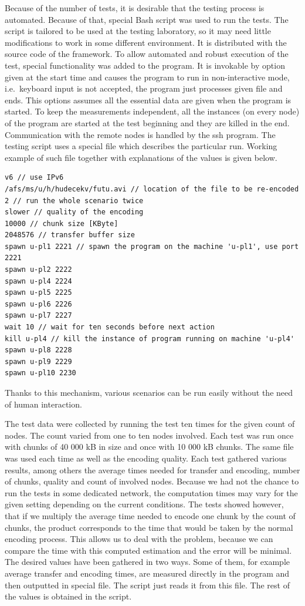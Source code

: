 Because of the number of tests, it is desirable that the testing process
is automated. Because of that, special Bash script was used to run the
tests. The script is tailored to be used at the testing laboratory, so
it may need little modifications to work in some different environment.
It is distributed with the source code of the framework. To allow
automated and robust execution of the test, special functionality was
added to the program. It is invokable by option given at the start time
and causes the program to run in non-interactive mode, i.e.~keyboard
input is not accepted, the program just processes given file and ends.
This options assumes all the essential data are given when the program
is started. To keep the measurements independent, all the instances (on
every node) of the program are started at the test beginning and they
are killed in the end. Communication with the remote nodes is handled by
the ssh program. The testing script uses a special file which describes
the particular run. Working example of such file together with
explanations of the values is given below.

\begin{samepage}
\begin{verbatim}
v6 // use IPv6
/afs/ms/u/h/hudecekv/futu.avi // location of the file to be re-encoded
2 // run the whole scenario twice
slower // quality of the encoding
10000 // chunk size [KByte]
2048576 // transfer buffer size
spawn u-pl1 2221 // spawn the program on the machine 'u-pl1', use port 2221
spawn u-pl2 2222
spawn u-pl4 2224
spawn u-pl5 2225
spawn u-pl6 2226
spawn u-pl7 2227
wait 10 // wait for ten seconds before next action
kill u-pl4 // kill the instance of program running on machine 'u-pl4'
spawn u-pl8 2228
spawn u-pl9 2229
spawn u-pl10 2230
\end{verbatim}
\end{samepage}

Thanks to this mechanism, various scenarios can be run easily without
the need of human interaction.

The test data were collected by running the test ten times for the given
count of nodes. The count varied from one to ten nodes involved. Each
test was run once with chunks of 40 000 kB in size and once with 10 000
kB chunks. The same file was used each time as well as the encoding
quality. Each test gathered various results, among others the average
times needed for transfer and encoding, number of chunks, quality and
count of involved nodes. Because we had not the chance to run the tests
in some dedicated network, the computation times may vary for the given
setting depending on the current conditions. The tests showed however,
that if we multiply the average time needed to encode one chunk by the
count of chunks, the product corresponds to the time that would be taken
by the normal encoding process. This allows us to deal with the problem,
because we can compare the time with this computed estimation and the
error will be minimal. The desired values have been gathered in two
ways. Some of them, for example average transfer and encoding times, are
measured directly in the program and then outputted in special file. The
script just reads it from this file. The rest of the values is obtained
in the script.


